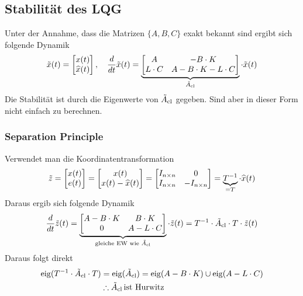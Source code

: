 \subsection{Stabilität des LQG}
    Unter der Annahme, dass die Matrizen $\{A, B, C\}$ exakt bekannt sind ergibt sich folgende Dynamik
    \begin{equation*}
        \Tilde{x}(t) = \begin{bmatrix}x(t)\\\widehat{x}(t)\end{bmatrix},\quad
        \frac{d}{dt}\Tilde{x}(t) = 
        \underbrace{\begin{bmatrix}
        A   &   -B\cdot K\\
        L\cdot C & A-B\cdot K-L\cdot C
        \end{bmatrix}}_{\Tilde{A}_{\textnormal{cl}}}
        \cdot \Tilde{x}(t)
    \end{equation*}
    Die Stabilität ist durch die Eigenwerte von $\Tilde{A}_{\textnormal{cl}}$ gegeben. Sind aber in dieser Form nicht einfach zu berechnen.
    
    \subsubsection{Separation Principle}
        Verwendet man die Koordinatentransformation
        \begin{equation*}
            \Tilde{z} = 
            \begin{bmatrix}
            x(t)\\e(t)
            \end{bmatrix}
            =
            \begin{bmatrix}
            x(t)\\x(t)-\widehat{x}(t)
            \end{bmatrix}
            =
            \begin{bmatrix}
            I_{n\times n} & 0\\I_{n\times n} & -I_{n\times n}
            \end{bmatrix}
            = \underbrace{T^{-1}}_{=T}\cdot\widehat{x}(t)
        \end{equation*}
        Daraus ergib sich folgende Dynamik
        \begin{equation*} 
            \frac{d}{dt}\Tilde{z}(t) = 
            \underbrace{\begin{bmatrix}
            A-B\cdot K   &   B\cdot K\\
            0 & A-L\cdot C
            \end{bmatrix}}_{\textnormal{gleiche EW wie }\Tilde{A}_{\textnormal{cl}}}
            \cdot\Tilde{z}(t) = T^{-1}\cdot\Tilde{A}_\textnormal{cl}\cdot T\cdot\Tilde{z}(t)
        \end{equation*}
        Daraus folgt direkt
        \begin{align*}
            \operatorname{eig}(T^{-1}\cdot\Tilde{A}_\textnormal{cl}\cdot T) &= \operatorname{eig}(\Tilde{A}_\textnormal{cl}) = \operatorname{eig}(A-B\cdot K)\cup \operatorname{eig}(A-L\cdot C)\\ 
            &\therefore \Tilde{A}_\textnormal{cl}\,\textnormal{ist Hurwitz}
        \end{align*}